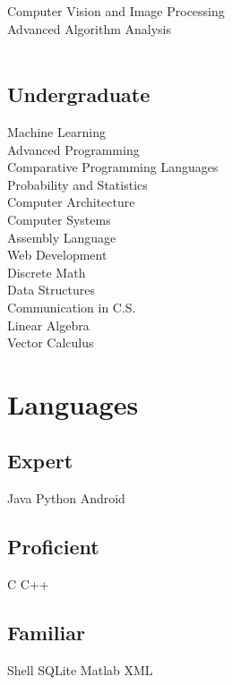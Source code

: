 \documentclass[letterpaper]{deedy-resume} %
\begin{document}
\begin{minipage}[t]{0.30\textwidth}
Computer Vision and Image Processing \\
Advanced Algorithm Analysis \\\
\subsection{Undergraduate}


Machine Learning \\
Advanced Programming \\
Comparative Programming Languages \\
Probability and Statistics \\
Computer Architecture \\ 
Computer Systems \\
Assembly Language \\
Web Development \\
Discrete Math \\
Data Structures \\
Communication in C.S. \\
Linear Algebra \\
Vector Calculus \\


\sectionspace %


\section{Languages}


\subsection{Expert}
Java \textbullet{} Python \textbullet{} Android \\ 
\subsection{Proficient}
C \textbullet{} C++ \\
\subsection{Familiar}
 Shell  \textbullet{} SQLite  \textbullet{} Matlab \textbullet{} XML 

\sectionspace %


\end{minipage}
\end{document}
